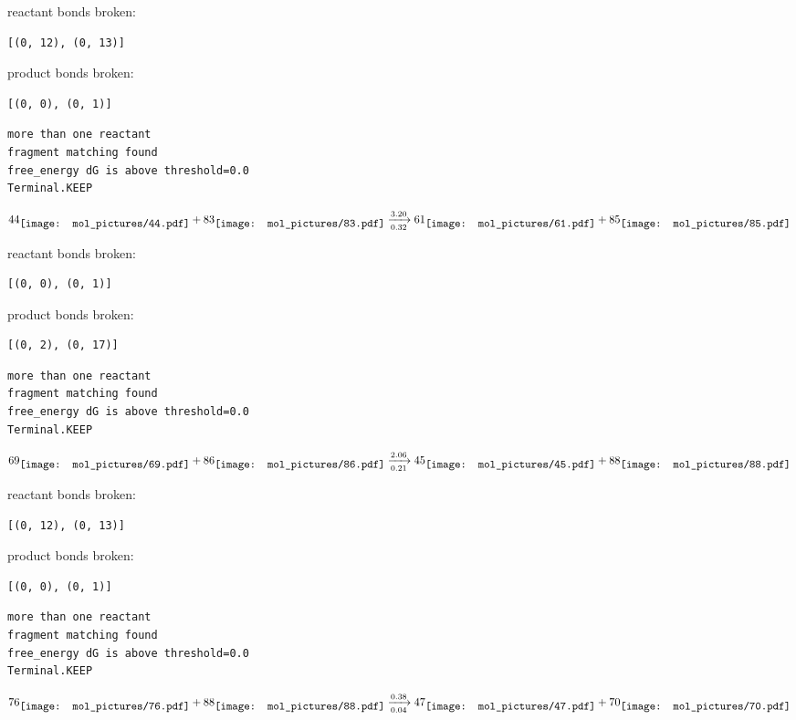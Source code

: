 \documentclass{article}
\begin{document}
reactant bonds broken:\begin{verbatim}
[(0, 12), (0, 13)]
\end{verbatim}
product bonds broken:\begin{verbatim}
[(0, 0), (0, 1)]
\end{verbatim}




\vspace{1cm}
\begin{verbatim}
more than one reactant
fragment matching found
free_energy dG is above threshold=0.0
Terminal.KEEP
\end{verbatim}
$$
44
\raisebox{-.5\height}{\texttt{[image: mol\_pictures/44.pdf]}}
+
83
\raisebox{-.5\height}{\texttt{[image: mol\_pictures/83.pdf]}}
\xrightarrow[0.32]{3.20}
61
\raisebox{-.5\height}{\texttt{[image: mol\_pictures/61.pdf]}}
+
85
\raisebox{-.5\height}{\texttt{[image: mol\_pictures/85.pdf]}}
$$


reactant bonds broken:\begin{verbatim}
[(0, 0), (0, 1)]
\end{verbatim}
product bonds broken:\begin{verbatim}
[(0, 2), (0, 17)]
\end{verbatim}




\vspace{1cm}
\begin{verbatim}
more than one reactant
fragment matching found
free_energy dG is above threshold=0.0
Terminal.KEEP
\end{verbatim}
$$
69
\raisebox{-.5\height}{\texttt{[image: mol\_pictures/69.pdf]}}
+
86
\raisebox{-.5\height}{\texttt{[image: mol\_pictures/86.pdf]}}
\xrightarrow[0.21]{2.06}
45
\raisebox{-.5\height}{\texttt{[image: mol\_pictures/45.pdf]}}
+
88
\raisebox{-.5\height}{\texttt{[image: mol\_pictures/88.pdf]}}
$$


reactant bonds broken:\begin{verbatim}
[(0, 12), (0, 13)]
\end{verbatim}
product bonds broken:\begin{verbatim}
[(0, 0), (0, 1)]
\end{verbatim}




\vspace{1cm}
\begin{verbatim}
more than one reactant
fragment matching found
free_energy dG is above threshold=0.0
Terminal.KEEP
\end{verbatim}
$$
76
\raisebox{-.5\height}{\texttt{[image: mol\_pictures/76.pdf]}}
+
88
\raisebox{-.5\height}{\texttt{[image: mol\_pictures/88.pdf]}}
\xrightarrow[0.04]{0.38}
47
\raisebox{-.5\height}{\texttt{[image: mol\_pictures/47.pdf]}}
+
70
\raisebox{-.5\height}{\texttt{[image: mol\_pictures/70.pdf]}}
$$
\end{document}
